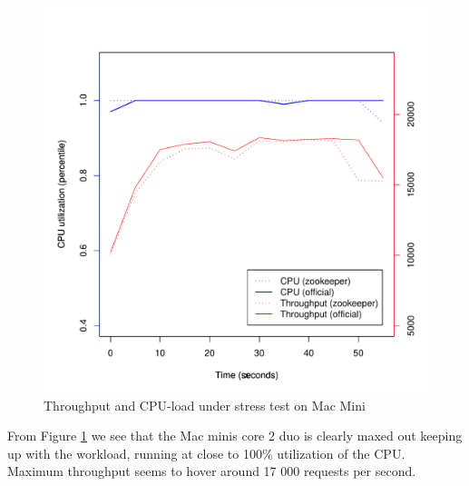\begin{figure}[h]
    \centering
    \includegraphics[width=1.0\textwidth]{results/throughput/singlenode/throughput_macmini}
    \caption{Throughput and CPU-load under stress test on Mac Mini}
    \label{fig:thug_mini}
\end{figure}

From Figure \ref{fig:thug_mini} we see that the Mac minis core 2 duo is clearly maxed out keeping up with the workload, running at close to 100\% utilization of the CPU. Maximum throughput seems to hover around 17 000 requests per second.  

\clearpage

